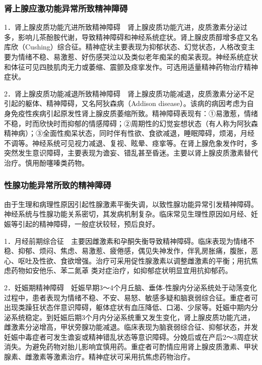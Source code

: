 \subsubsection{肾上腺应激功能异常所致精神障碍}

1．肾上腺皮质功能亢进所致精神障碍　肾上腺皮质功能亢进，皮质激素分泌过多，影响儿茶酚胺代谢，导致精神障碍和神经系统症状。肾上腺皮质醇增多症又名库欣（Cushing）综合征。精神症状主要表现为抑郁状态、幻觉状态，人格改变主要为情绪不稳、易激惹、好伤感哭泣以及类似老年痴呆的痴呆表现。神经系统症状和体征可见四肢肌肉无力或萎缩、震颤及痉挛发作。可选用适量精神药物治疗精神症状。

2．肾上腺皮质功能减退所致精神障碍　肾上腺皮质功能减退，皮质激素分泌不足引起的躯体、精神障碍，又名阿狄森病（Addison
disease）。该病的病因考虑为自身免疫性疾病引起原发性肾上腺皮质萎缩所致。精神障碍表现有：①易激惹，情绪不稳，时而欣快时而抑郁的情感障碍；②周期性的幻觉妄想状态（有人称为阿狄森精神病）；③全面性痴呆状态，同时伴有性欲、食欲减退，睡眠障碍，烦渴，月经不调等。神经系统可见视力减退、复视、眩晕、痉挛等。在肾上腺危象发作时，多突然发生意识障碍，主要表现为谵妄、错乱甚至昏迷。主要以肾上腺皮质激素替代治疗。慎用酚噻嗪类药物。

\subsubsection{性腺功能异常所致的精神障碍}

由于生理和病理性原因引起性腺激素平衡失调，以致性腺功能异常引发精神障碍。神经系统与性腺功能关系密切，其发病机制复杂。临床常见生理性原因如月经、妊娠等引起的精神障碍，一般症状较轻，预后良好。

1．月经前期综合征　主要因雌激素和孕酮失衡导致精神障碍。临床表现为情绪不稳、抑郁、烦闷、焦虑、易激惹、疲倦感，偶见失神发作，伴乳房胀痛，腹胀，恶心、呕吐及性欲、食欲增强。治疗可采用促性腺激素以调整雌激素的平衡；用抗焦虑药物如安他乐、苯二氮䓬
类对症治疗，如抑郁症状明显宜用抗抑郁药。

2．妊娠期精神障碍　妊娠早期3～4个月丘脑、垂体-性腺内分泌系统处于动荡变化过程中，患者表现为情绪不稳、不安、易怒、敏感多疑和脑衰弱综合征。重症者可出现类躁狂状态伴意识障碍，躯体症状有血压降低、口渴、少尿等。妊娠中期内分泌系统稳定。到妊娠后期3个月内分泌系统重又发生变化，肾上腺皮质功能亢进，雌激素分泌增高，甲状旁腺功能减退。临床表现为脑衰弱综合征、抑郁状态，并发妊娠中毒症者可发生谵妄或精神错乱状态等意识障碍。分娩后或在产后2～3周症状消失。为避免药物对胎儿影响宜慎用药。重症者可酌情应用肾上腺皮质激素、甲状腺素、雌激素等激素治疗。精神症状可采用抗焦虑药物治疗。

